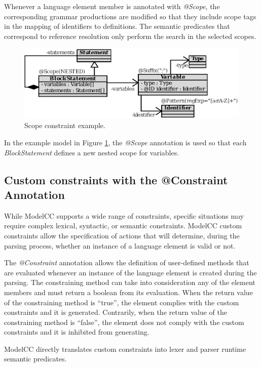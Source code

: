 \documentclass[a4paper,twoside,onecolumn]{article}
\newcommand{\an}[1]{\emph{#1}} %
\begin{document}
Whenever a language element member is annotated with \emph{@Scope}, the corresponding grammar productions are modified so that they include scope tags in the mapping of identifiers to definitions. The semantic predicates that correspond to reference resolution only perform the search in the selected scopes.

\begin{figure}[tb!]
\centering
\includegraphics[scale=1]{blockscope.eps}
\caption{Scope constraint example.}
\label{fig:blockscope}
\end{figure}

In the example model in Figure \ref{fig:blockscope}, the \an{@Scope} annotation is used so that each \emph{BlockStatement} defines a new nested scope for variables.

\subsection{Custom constraints with the @Constraint Annotation} \label{subsec:custom}

While ModelCC supports a wide range of constraints, specific situations may require complex lexical, syntactic, or semantic constraints.
ModelCC custom constraints allow the specification of actions that will determine, during the parsing process, whether an instance of a language element is valid or not.

The \an{@Constraint} annotation allows the definition of user-defined methods that are evaluated whenever an instance of the language element is created during the parsing.
The constraining method can take into consideration any of the element members and must return a boolean from its evaluation.
When the return value of the constraining method is ``true'', the element complies with the custom constraints and it is generated.
Contrarily, when the return value of the constraining method is ``false'', the element does not comply with the custom constraints and it is inhibited from generating.

ModelCC directly translates custom constraints into lexer and parser runtime semantic predicates.
\end{document}
